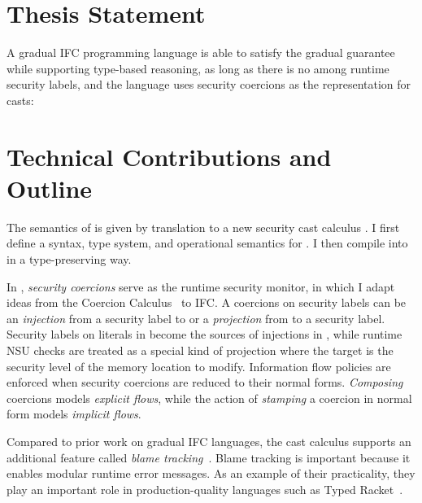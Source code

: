 \section{Thesis Statement}


A gradual IFC programming language is able to satisfy the gradual guarantee
while supporting type-based reasoning, as long as there is no \unk among runtime
security labels, and the language uses security coercions as the representation
for casts:

\vspace{20pt}


\section{Technical Contributions and Outline}

The semantics of \Surface is given by translation to a new security cast
calculus \CC. I first define a syntax, type system, and operational semantics
for \CC. I then compile \Surface into \CC in a type-preserving way.

In \CC, \textit{security coercions} serve as the runtime security monitor, in
which I adapt ideas from the Coercion
Calculus~\parencite{Henglein:1994nz,Herman:2010aa} to IFC. A coercions on
security labels can be an \textit{injection} from a security label to \unk or a
\textit{projection} from \unk to a security label. Security labels on literals
in \Surface become the sources of injections in \CC, while runtime NSU checks
are treated as a special kind of projection where the target is the security
level of the memory location to modify. Information flow policies are enforced
when security coercions are reduced to their normal forms. \textit{Composing}
coercions models \textit{explicit flows}, while the action of \textit{stamping}
a coercion in normal form models \textit{implicit flows}.

Compared to prior work on gradual IFC languages, the \CC cast calculus supports
an additional feature called \textit{blame tracking}~\parencite{Findler:2002eu}.
Blame tracking is important because it enables modular runtime error messages.
As an example of their practicality, they play an important role in
production-quality languages such as Typed
Racket~\parencite{Tobin-Hochstadt:2008lr,Preston-Tunnell-Wilson:2018aa}.

